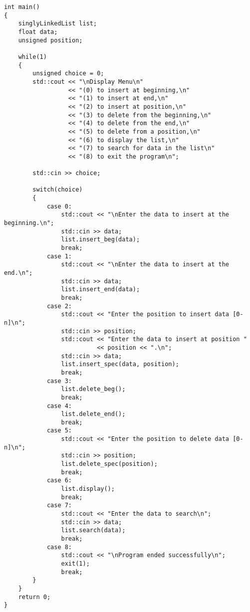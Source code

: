 \documentclass[12pt]{article}
\begin{document}
	\begin{verbatim}
int main()
{
    singlyLinkedList list;
    float data;
    unsigned position;

    while(1) 
    {
        unsigned choice = 0; 
        std::cout << "\nDisplay Menu\n"
                  << "(0) to insert at beginning,\n"
                  << "(1) to insert at end,\n"
                  << "(2) to insert at position,\n"
                  << "(3) to delete from the beginning,\n"
                  << "(4) to delete from the end,\n"
                  << "(5) to delete from a position,\n"
                  << "(6) to display the list,\n"
                  << "(7) to search for data in the list\n"
                  << "(8) to exit the program\n";

        std::cin >> choice; 

        switch(choice)
        { 
            case 0:
                std::cout << "\nEnter the data to insert at the beginning.\n";
                std::cin >> data;
                list.insert_beg(data);
                break; 
            case 1:
                std::cout << "\nEnter the data to insert at the end.\n";
                std::cin >> data;
                list.insert_end(data);
                break;
            case 2:
                std::cout << "Enter the position to insert data [0-n]\n";
                std::cin >> position;
                std::cout << "Enter the data to insert at position " 
                          << position << ".\n";
                std::cin >> data;
                list.insert_spec(data, position);
                break; 
            case 3:
                list.delete_beg();
                break;
            case 4:
                list.delete_end();
                break; 
            case 5:
                std::cout << "Enter the position to delete data [0-n]\n";
                std::cin >> position;
                list.delete_spec(position);
                break;
            case 6:
                list.display();
                break; 
            case 7:
                std::cout << "Enter the data to search\n";
                std::cin >> data;
                list.search(data);
                break;
            case 8:
                std::cout << "\nProgram ended successfully\n"; 
                exit(1);
                break; 
        } 
    }
    return 0;
}

	\end{verbatim}
	\newpage
\end{document}
